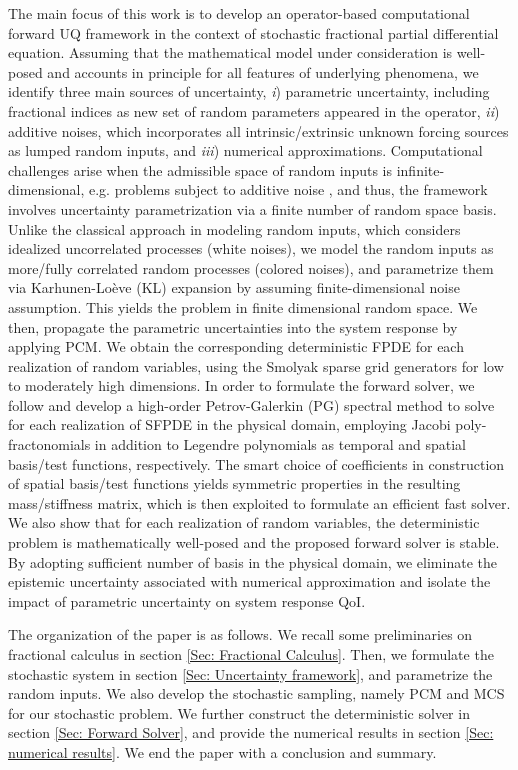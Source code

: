 The main focus of this work is to develop an operator-based computational forward UQ framework in the context of stochastic fractional partial differential equation. Assuming that the mathematical model under consideration is well-posed and accounts in principle for all features of underlying phenomena, we identify three main sources of uncertainty, \textit{i}) parametric uncertainty, including fractional indices as new set of random parameters appeared in the operator, \textit{ii}) additive noises, which incorporates all intrinsic/extrinsic unknown forcing sources as lumped random inputs, and \textit{iii}) numerical approximations. Computational challenges arise when the admissible space of random inputs is infinite-dimensional, e.g. problems subject to additive noise \cite{rizzi2012uncertainty}, and thus, the framework involves uncertainty parametrization via a finite number of random space basis. Unlike the classical approach in modeling random inputs, which considers idealized uncorrelated processes (white noises), we model the random inputs as more/fully correlated random processes (colored noises), and parametrize them via Karhunen-Lo\`{e}ve (KL) expansion by assuming finite-dimensional noise assumption. This yields the problem in finite dimensional random space. We then, propagate the parametric uncertainties into the system response by applying PCM. We obtain the corresponding deterministic FPDE for each realization of random variables, using the Smolyak sparse grid generators for low to moderately high dimensions. In order to formulate the forward solver, we follow \cite{samiee2016} and develop a high-order Petrov-Galerkin (PG) spectral method to solve for each realization of SFPDE in the physical domain, employing Jacobi poly-fractonomials in addition to Legendre polynomials as temporal and spatial basis/test functions, respectively. The smart choice of coefficients in construction of spatial basis/test functions yields symmetric properties in the resulting mass/stiffness matrix, which is then exploited to formulate an efficient fast solver. We also show that for each realization of random variables, the deterministic problem is mathematically well-posed and the proposed forward solver is stable. By adopting sufficient number of basis in the physical domain, we eliminate the epistemic uncertainty associated with numerical approximation and isolate the impact of parametric uncertainty on system response QoI.



The organization of the paper is as follows. We recall some preliminaries on fractional calculus in section \ref{Sec: Fractional Calculus}. Then, we formulate the stochastic system in section \ref{Sec: Uncertainty framework}, and parametrize the random inputs. We also develop the stochastic sampling, namely PCM and MCS for our stochastic problem. We further construct the deterministic solver in section \ref{Sec: Forward Solver}, and provide the numerical results in section \ref{Sec: numerical results}. We end the paper with a conclusion and summary.



